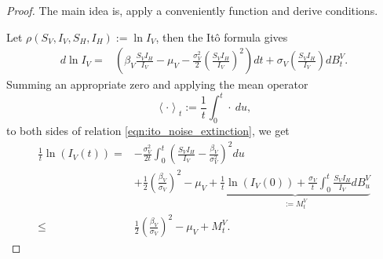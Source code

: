 \begin{proof}
    The main idea is, apply a conveniently function and derive conditions. 
    
    Let $\rho (S_V, I_V, S_H, I_H)           := \ln I_V$, then the It\^{o} 
    formula 
    gives
    \begin{equation} \label{eqn:ito_noise_extinction}
        \begin{aligned}
            d \ln I_V = & 
                \left(
                    \beta_V
                    \frac{S_V I_H}{ I_V} - \mu_V
                    - \frac{\sigma_V ^ 2}{2}
                    \left(
                        \frac{ S_V I_H}{I_V}
                    \right) ^ 2
                \right) dt
                 + \sigma_V 
                \left(
                    \frac{S_V I_H}{ I_V}
                \right) dB_t ^ V.
        \end{aligned}
    \end{equation}
    Summing an appropriate zero and applying the mean operator
    $$
        \left < \cdot \right >_t
        := 
            \frac{1}{t}
            \int_{0} ^ t
                \cdot \ du,
    $$
    to both sides of relation \eqref{eqn:ito_noise_extinction}, we get
    \begin{equation} \label{eqn:applying_mean_opeartor}
        \begin{aligned}
            \frac{1}{t} \ln(I_V(t))
            =&
            - 
            \frac{\sigma_V ^ 2}{2t}
            \int_{0} ^ {t}
                \left(
                    \frac{S_V I_H}{I_V} 
                    -
                    \frac{\beta_V}{\sigma_V ^ 2}
                \right)^2
            du
            \\
            & 
            + 
            \frac{1}{2}
            \left(
                \frac{\beta_V}{\sigma_V}
            \right) ^ 2
            -
            \mu_V 
            + 
            \underbrace{
                \frac{1}{t} \ln(I_V(0))
                +
                \frac{\sigma_V}{t}
                \int_{0}^t
                    \frac{S_V I_H}{I_V}
                    dB_u^V
            }_{:=M_t ^ V}
            \\
            \leq
                &
            \frac{1}{2}
            \left(
                \frac{\beta_V}{\sigma_V}
            \right) ^ 2
            -
            \mu_V 
            + 
            M_t ^ V.
        \end{aligned}

\end{equation}
\end{proof}
